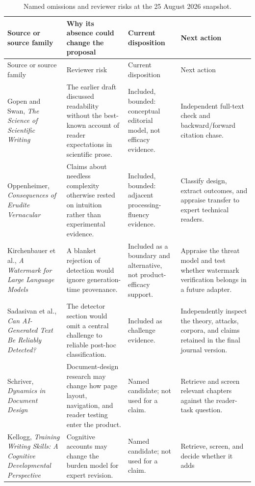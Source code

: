 \begin{longtable}{@{}>{\raggedright\arraybackslash}p{}
>{\raggedright\arraybackslash}p{}
>{\raggedright\arraybackslash}p{}
>{\raggedright\arraybackslash}p{}@{}}
\caption{Named omissions and reviewer risks at the 25 August 2026 snapshot.}
\label{tab:omission-register}\\
\toprule
Source or source family & Why its absence could change the proposal & Current
disposition & Next action \\
\midrule
\endfirsthead
\toprule
Source or source family & Reviewer risk & Current disposition & Next action \\
\midrule
\endhead
Gopen and Swan, \emph{The Science of Scientific Writing} & The earlier draft
discussed readability without the best-known account of reader expectations in
scientific prose. & Included, bounded: conceptual editorial model, not efficacy
evidence. & Independent full-text check and backward/forward citation chase. \\
Oppenheimer, \emph{Consequences of Erudite Vernacular} & Claims about needless
complexity otherwise rested on intuition rather than experimental evidence. &
Included, bounded: adjacent processing-fluency evidence. & Classify design,
extract outcomes, and appraise transfer to expert technical readers. \\
Kirchenbauer et al., \emph{A Watermark for Large Language Models} & A blanket
rejection of detection would ignore generation-time provenance. & Included as
a boundary and alternative, not product-efficacy support. & Appraise the threat
model and test whether watermark verification belongs in a future adapter. \\
Sadasivan et al., \emph{Can AI-Generated Text Be Reliably Detected?} & The
detector section would omit a central challenge to reliable post-hoc
classification. & Included as challenge evidence. & Independently inspect the
theory, attacks, corpora, and claims retained in the final journal version. \\
Schriver, \emph{Dynamics in Document Design} & Document-design research may
change how page layout, navigation, and reader testing enter the product. &
Named candidate; not used for a claim. & Retrieve and screen relevant chapters
against the reader-task question. \\
Kellogg, \emph{Training Writing Skills: A Cognitive Developmental Perspective}
& Cognitive accounts may change the burden model for expert revision. & Named
candidate; not used for a claim. & Retrieve, screen, and decide whether it adds

\end{longtable}
